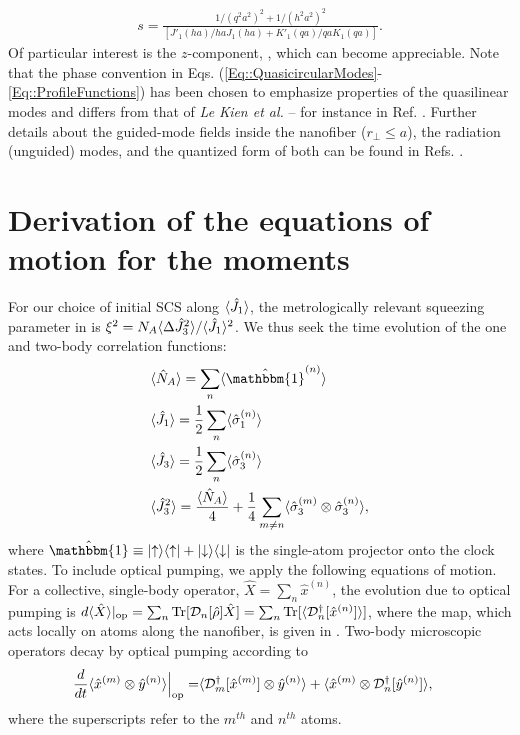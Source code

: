 \documentclass[aps,pra,twocolumn]{revtex4-1} %
\newcommand{\jx}{\hat{J}_1}
\begin{document}
\begin{appendix}
	\begin{align}
		s = \frac{1/(q^2 a^2)^{2} + 1/(h^2 a^2)^{2}}{[J'_1(ha)/haJ_1(ha) + K'_1(qa)/qaK_1(qa)]}.
	\end{align}  
Of particular interest is the $z$-component, , which can become appreciable.  Note that the phase convention in Eqs. (\ref{Eq::QuasicircularModes}-\ref{Eq::ProfileFunctions}) has been chosen to emphasize properties of the quasilinear modes and differs from that of \emph{Le Kien et al.} -- for instance in Ref. \cite{le_kien_propagation_2014}.  
Further details about the guided-mode fields inside the nanofiber ($r_\perp\leq a$), the radiation (unguided) modes, and the quantized form of both can be found in Refs. \cite{sondergaard_general_2001, tong_single-mode_2004, kien_field_2004, le_kien_spontaneous_2005, vetsch_eugen_optical_2010}.


\section{Derivation of the equations of motion for the moments} \label{Appendix::OpticalPumping}	

For our choice of initial SCS along $\expt{\jx}$, the metrologically relevant squeezing parameter in  is $\xi^2 = N_A \langle{\Delta \hat{J}_3^2}\rangle/\langle{\hat{J}_1}\rangle^2$.  
We thus seek the time evolution of the one and two-body correlation functions:
\begin{align}
&\expt{\hat{N}_A} = \sum_n \expt{\hat{\mathbbm{1}}^{(n)}} \\
&\expt{\hat{J}_1} = \frac{1}{2} \sum_n \expt{\hat{\sigma}_1^{(n)}} \\
&\expt{\hat{J}_3} = \frac{1}{2} \sum_n \expt{\hat{\sigma}_3^{(n)}} \\
&\expt{\hat{J}_3^2} = \frac{\expt{\hat{N}_A}}{4} +\frac{1}{4} \sum_{m \neq n} \expt{\hat{\sigma}_3^{(m)}\otimes \hat{\sigma}_3^{(n)}}, 
\end{align}
where $\hat{\mathbbm{1}} \equiv \op{\uparrow}{\uparrow} + \op{\downarrow}{\downarrow}$ is the single-atom projector onto the clock states. 
To include optical pumping, we apply the following equations of motion. For a collective, single-body operator, $\hat{X} = \sum_n \hat{x}^{(n)}$, the evolution due to optical pumping is $d\langle{ \hat{X}}\rangle|_{\rm op} = \sum_n \mbox{Tr} [\mathcal{D}_n[\hat{\rho}]\hat{X} ] = \sum_n \mbox{Tr} [\langle{\mathcal{D}_n^\dagger[\hat{x}^{(n)}]}\rangle ] $, where the map, which acts locally on atoms along the nanofiber, is given in .  
Two-body microscopic operators decay by optical pumping according to \cite{baragiola_three-dimensional_2014}
	\begin{align} \label{Eq::TwoBodyDecay}
		\frac{d}{dt} \langle{ \hat{x}^{(m)} \otimes \hat{y}^{(n)} }\rangle \Big|_{\rm op}= &\langle{ \mathcal{D}_m^\dagger[ \hat{x}^{(m)}] \otimes \hat{y}^{(n)} }\rangle + \langle{ \hat{x}^{(m)}\otimes \mathcal{D}_n^\dagger[ \hat{y}^{(n)}] }\rangle,
	\end{align}
where the superscripts refer to the $m^{th}$ and $n^{th}$ atoms. 


\end{appendix}
\end{document}
